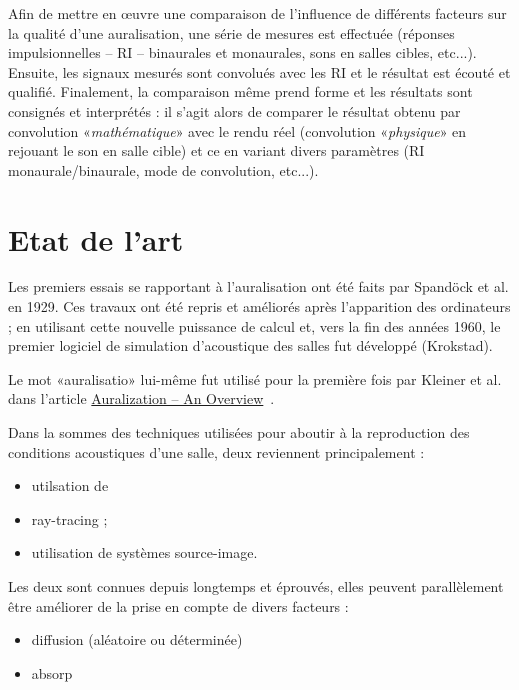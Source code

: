 \documentclass[a4paper, 11pt]{report}
\begin{document}
\medskip

Afin de mettre en œuvre une comparaison de l'influence de différents facteurs sur la qualité d'une auralisation, une
série de mesures est effectuée (réponses impulsionnelles -- RI --  binaurales et monaurales, sons en salles cibles,
etc...).  Ensuite, les signaux mesurés sont convolués avec les RI et le résultat est écouté et qualifié. Finalement, la
comparaison même prend forme et les résultats sont consignés et interprétés : il s'agit alors de comparer le résultat
obtenu par convolution «\emph{mathématique}» avec le rendu réel (convolution «\emph{physique}» en rejouant le son en
salle cible) et ce en variant divers paramètres (RI monaurale/binaurale, mode de convolution, etc...).

\section{Etat de l'art}

Les premiers essais se rapportant à l'auralisation ont été faits par Spandöck et al. en 1929.
Ces travaux ont été repris et améliorés après l'apparition des ordinateurs ; en utilisant cette nouvelle puissance de
calcul et, vers la fin des années 1960, le premier logiciel de simulation d'acoustique des salles fut développé
(Krokstad).

Le mot «auralisatio» lui-même fut utilisé pour la première fois par Kleiner et al. dans l'article
\underline{Auralization -- An Overview}~\cite{kleiner1993}.

Dans la sommes des techniques utilisées pour aboutir à la reproduction des conditions acoustiques d'une salle, deux
reviennent principalement :

\begin{itemize}
    \item utilsation de \item{ray-tracing} ;
    \item utilisation de systèmes source-image.
\end{itemize}

Les deux sont connues depuis longtemps et éprouvés, elles peuvent parallèlement être améliorer de la prise en compte de
divers facteurs :

\begin{itemize}
    \item diffusion (aléatoire ou déterminée)
    \item absorp
\end{itemize}



\end{document}
